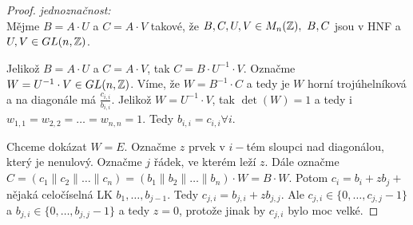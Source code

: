 \begin{proof}
    \emph{jednoznačnost:}\\
    Mějme $B = A \cdot U$ a $C = A \cdot V$ takové, že $B,C,U,V \in M_n(\operatorname{\mathbb{Z}}),\ B,C$ jsou v HNF a $U,V \in GL(n, \operatorname{\mathbb{Z}})$.

    Jelikož $B = A \cdot U$ a $C = A \cdot V$, tak $C = B \cdot U^{-1} \cdot V$. Označme $W = U^{-1} \cdot V \in GL(n,\operatorname{\mathbb{Z}})$. Víme, že $W = B^{-1} \cdot C$ a tedy je $W$ horní trojúhelníková a na diagonále má $\frac{c_{i,i}}{b_{i,i}}$.
    Jelikož $W = U^{-1} \cdot V$, tak $\det(W) = 1$ a tedy i $w_{1,1} = w_{2,2} = \dots = w_{n,n} = 1$. Tedy $b_{i,i} = c_{i,i} \forall i$.

    Chceme dokázat $W = E$. 
    Označme $z$ prvek v $i-$tém sloupci nad diagonálou, který je nenulový. Označme $j$ řádek, ve kterém leží $z$. Dále označme $C = (c_1\|c_2\|\dots \| c_n) = (b_1\|b_2\|\dots \| b_n) \cdot W = B \cdot W$. Potom $c_i = b_i + zb_j + $ nějaká celočíselná LK $b_1, \dots , b_{j-1}$. 
    Tedy $c_{j,i} = b_{j,i} + zb_{j,j}$. Ale $c_{j,i} \in \{0, \dots, c_{j,j}-1\}$ a $b_{j,i} \in \{0, \dots, b_{j,j}-1\}$ a tedy $z=0$, protože jinak by $c_{j,i}$ bylo moc velké.
\end{proof}

